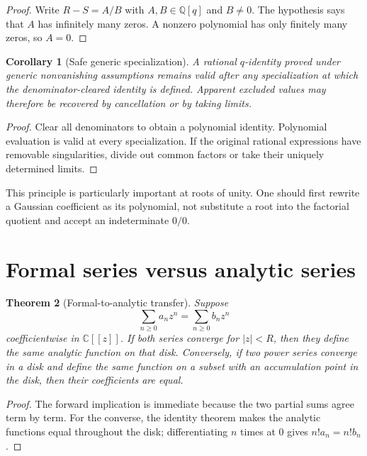 \documentclass[11pt,oneside,openany]{book}
\newtheorem{theorem}{Theorem}[chapter]
\newtheorem{corollary}[theorem]{Corollary}
\theoremstyle{definition}
\theoremstyle{remark}
\newcommand{\C}{\mathbb C}
\newcommand{\Q}{\mathbb Q}
\newcommand{\abs}[1]{\lvert #1\rvert}
\begin{document}
\begin{proof}
Write $R-S=A/B$ with $A,B\in\Q[q]$ and $B\ne0$.  The hypothesis says that $A$ has infinitely many zeros.  A nonzero polynomial has only finitely many zeros, so $A=0$.
\end{proof}

\begin{corollary}[Safe generic specialization]\label{cor:safe-specialization}
A rational $q$-identity proved under generic nonvanishing assumptions remains valid after any specialization at which the denominator-cleared identity is defined.  Apparent excluded values may therefore be recovered by cancellation or by taking limits.
\end{corollary}

\begin{proof}
Clear all denominators to obtain a polynomial identity.  Polynomial evaluation is valid at every specialization.  If the original rational expressions have removable singularities, divide out common factors or take their uniquely determined limits.
\end{proof}

This principle is particularly important at roots of unity.  One should first rewrite a Gaussian coefficient as its polynomial, not substitute a root into the factorial quotient and accept an indeterminate $0/0$.

\section{Formal series versus analytic series}

\begin{theorem}[Formal-to-analytic transfer]\label{thm:formal-analytic-transfer}
Suppose
\[
 \sum_{n\ge0}a_nz^n=\sum_{n\ge0}b_nz^n
\]
coefficientwise in $\C[[z]]$.  If both series converge for $\abs z<R$, then they define the same analytic function on that disk.  Conversely, if two power series converge in a disk and define the same function on a subset with an accumulation point in the disk, then their coefficients are equal.
\end{theorem}

\begin{proof}
The forward implication is immediate because the two partial sums agree term by term.  For the converse, the identity theorem makes the analytic functions equal throughout the disk; differentiating $n$ times at $0$ gives $n!a_n=n!b_n$.
\end{proof}
\end{document}
